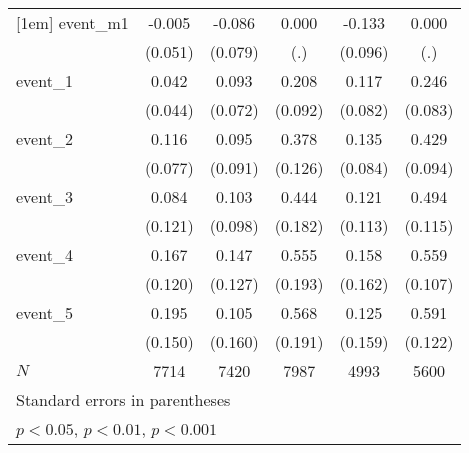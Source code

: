 {\begin{tabular}{l*{5}{c}}
[1em]
event\_m1    &      -0.005         &      -0.086         &       0.000         &      -0.133         &       0.000         \\
            &     (0.051)         &     (0.079)         &         (.)         &     (0.096)         &         (.)         \\
[1em]
event\_1     &       0.042         &       0.093         &       0.208\sym{*}  &       0.117         &       0.246\sym{**} \\
            &     (0.044)         &     (0.072)         &     (0.092)         &     (0.082)         &     (0.083)         \\
[1em]
event\_2     &       0.116         &       0.095         &       0.378\sym{**} &       0.135         &       0.429\sym{***}\\
            &     (0.077)         &     (0.091)         &     (0.126)         &     (0.084)         &     (0.094)         \\
[1em]
event\_3     &       0.084         &       0.103         &       0.444\sym{*}  &       0.121         &       0.494\sym{***}\\
            &     (0.121)         &     (0.098)         &     (0.182)         &     (0.113)         &     (0.115)         \\
[1em]
event\_4     &       0.167         &       0.147         &       0.555\sym{**} &       0.158         &       0.559\sym{***}\\
            &     (0.120)         &     (0.127)         &     (0.193)         &     (0.162)         &     (0.107)         \\
[1em]
event\_5     &       0.195         &       0.105         &       0.568\sym{**} &       0.125         &       0.591\sym{***}\\
            &     (0.150)         &     (0.160)         &     (0.191)         &     (0.159)         &     (0.122)         \\
\hline
\(N\)       &        7714         &        7420         &        7987         &        4993         &        5600         \\
\hline\hline
\multicolumn{6}{l}{\footnotesize Standard errors in parentheses}\\
\multicolumn{6}{l}{\footnotesize \sym{*} \(p<0.05\), \sym{**} \(p<0.01\), \sym{***} \(p<0.001\)}\\
\end{tabular}
}
